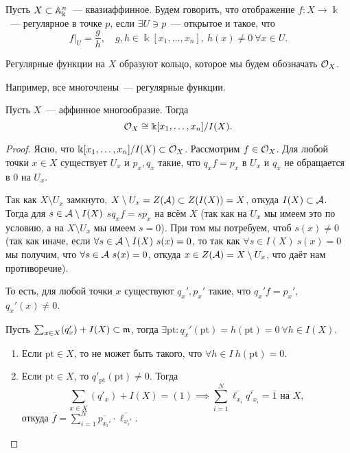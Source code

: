 	\begin{definition} 
		Пусть $X \subset \AA^{n}_{\Bbbk}$~--- квазиаффинное. Будем говорить, что отображение $f\colon X \to \Bbbk$~--- регулярное в точке $p$, если $\exists U \ni p$~--- открытое и такое, что 
		\[
			f\vert_{U} = \frac{g}{h}, \quad g, h \in \Bbbk[x_1, \ldots, x_n], \ h(x) \neq 0 \ \forall x \in U.
		\]
	\end{definition}

	Регулярные функции на $X$ образуют кольцо, которое мы будем обозначать $\cO_{X}$. 

	\begin{remark}
		Например, все многочлены~--- регулярные функции. 
	\end{remark}

	\begin{theorem} 
		Пусть $X$~--- аффинное многообразие. Тогда 
		\[
			\cO_{X} \cong \Bbbk[x_1, \ldots, x_n]/I(X).
		\]
	\end{theorem}
	\begin{proof}
		Ясно, что $\Bbbk[x_1, \ldots, x_n]/I(X) \subset \cO_{X}$. Рассмотрим $f \in \cO_{X}$. Для любой точки $x \in X$ существует $U_x$ и $p_x, q_x$ такие, что $q_x f = p_x$ в $U_x$ и $q_x$ не обращается в 0 на $U_x$. 

		Так как $X \setminus U_x$ замкнуто, $X \setminus U_x = Z(\cA) \subset Z(I(X)) = X$, откуда $I(X) \subset \cA$. Тогда для $s \in \cA \setminus I(X)$ $s q_x f = sp_x$ на всём $X$ (так как на $U_x$ мы имеем это по условию, а на $X \setminus U_x$ мы имеем $s = 0$). При том мы потребуем, чтоб $s(x) \neq 0$ (так как иначе, если $\forall s \in \cA \setminus I(X) \ s(x) = 0$, то так как $\forall s \in I(X) \ s(x) = 0$ мы получим, что $\forall s \in \cA \ s(x) = 0$, откуда $x \in Z(\cA) = X \setminus U_x$, что даёт нам противоречие). 

		То есть, для любой точки $x$ существуют $q_x', p_x'$ такие, что $q_x' f = p_x'$, $q_x'(x) \neq 0$. 

		Пусть $\sum_{x \in X} (q_x') + I(X) \subset \fm$, тогда $\exists \mathrm{pt} \colon q_x'(\mathrm{pt}) = h(\mathrm{pt}) = 0 \  \forall h \in I(X)$. 

		\begin{enumerate}
			\item Если $\mathrm{pt} \in X$, то не может быть такого, что $\forall h \in I \ h(\mathrm{pt}) = 0$. 

			\item Если $\mathrm{pt} \in X$, то $q'_{\mathrm{pt}}(\mathrm{pt}) \neq 0$. Тогда 
			\[
				\sum_{x \in X} (q'_{x}) + I(X) = (1) \implies \sum_{i = 1}^{N} \overline{\ell_{x_i}} \overline{q'_{x_i}} = \overline{1} \text{ на } X,
			\]
			откуда $\overline{f} = \sum_{i = 1}^{N} \overline{p_{x_i'}} \cdot \overline{\ell_{x_i'}}$.
		\end{enumerate}
	\end{proof}

